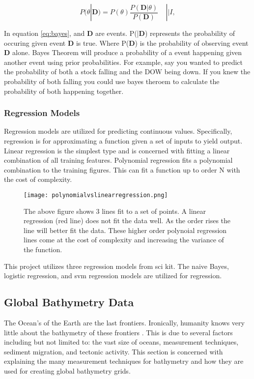 \begin{equation}
    \label{eq:bayes}
    P(\theta|\textbf{D}) = P(\theta ) \frac{P(\textbf{D} |\theta)}{P(\textbf{D})} ~~~~~|| I,
\end{equation}

In equation \ref{eq:bayes}, \theta and \textbf{D} are events. 
P(\theta|\textbf{D}) represents the probability of \theta occuring given event \textbf{D} is true.
Where P(\textbf{D}) is the probability of observing event \textbf{D} alone.
Bayes Theorem will produce a probability of a event happening given another event using prior probabilities.
For example, say you wanted to predict the probability of both a stock falling and the DOW being down.
If you knew the probability of both falling you could use bayes theroem to calculate the probability of both happening together.


\subsubsection{Regression Models}
Regression models are utilized for predicting continuous values.
Specifically, regression is for approximating a function given a set of inputs to yield output.
Linear regression is the simplest type and is concerned with fitting a linear combination of all training features.
Polynomial regression fits a polynomial combination to the training figures.
This can fit a function up to order N with the cost of complexity.

\begin{figure}[h]
    \centering
    \texttt{[image: polynomialvslinearregression.png]}
    \caption{The above figure shows 3 lines fit to a set of points. A linear regression (red line) does not fit the data well.
    As the order rises the line will better fit the data.
    These higher order polynoial regression lines come at the cost of complexity and increasing the variance of the function.}
    \label{}
\end{figure}


This project utilizes three regression models from sci kit.
The naive Bayes\cite{sklearn_api}, logistic regression\cite{sklearn_api}, and svm regression\cite{sklearn_api} models are utilized for regression.

\subsection{Global Bathymetry Data}
The Ocean's of the Earth are the last frontiers.
Ironically, humanity knows very little about the bathymetry of these frontiers \cite{becker2009global}.
This is due to several factors including but not limited to: the vast size of oceans, measurement techniques, sediment migration, and tectonic activity.
This section is concerned with explaining the many measurement techniques for bathymetry and how they are used for creating global bathymetry grids.


